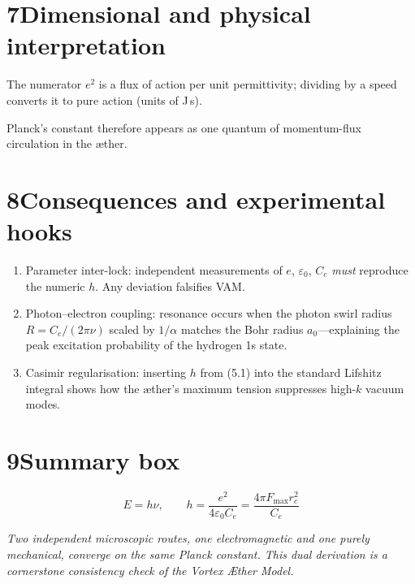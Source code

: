 \documentclass[11pt]{article}
\begin{document}
\section*{7\quad Dimensional and physical interpretation}

The numerator $e^{2}$ is a flux of action per unit permittivity; dividing by a speed converts it to pure action (units of J\,s).

Planck’s constant therefore appears as one quantum of momentum-flux circulation in the æther.

\section*{8\quad Consequences and experimental hooks}

\begin{enumerate}
    \item Parameter inter-lock: independent measurements of $e$, $\varepsilon_0$, $C_e$ \textit{must} reproduce the numeric $h$. Any deviation falsifies VAM.
    \item Photon--electron coupling: resonance occurs when the photon swirl radius $R = C_e/(2\pi\nu)$ scaled by $1/\alpha$ matches the Bohr radius $a_0$---explaining the peak excitation probability of the hydrogen 1s state.
    \item Casimir regularisation: inserting $h$ from (5.1) into the standard Lifshitz integral shows how the æther’s maximum tension suppresses high-$k$ vacuum modes.
\end{enumerate}

\section*{9\quad Summary box}

\[
    \boxed{
        E = h\nu,\qquad
        h = \frac{e^{2}}{4\varepsilon_0 C_e} = \frac{4\pi F_{\max} r_c^{2}}{C_e}
    }
\]

\textit{Two independent microscopic routes, one electromagnetic and one purely mechanical, converge on the same Planck constant. This dual derivation is a cornerstone consistency check of the Vortex Æther Model.}
\end{document}
